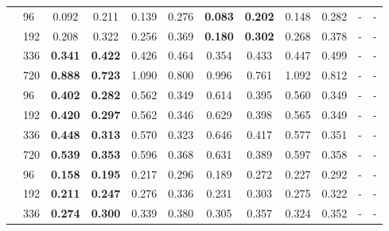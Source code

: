 \begin{table}[ht!]
\begin{center}
\begin{tabular}{ll | cccccccccc}
\parbox[t]{0.2mm}{}
	& 96  & 0.092           & 0.211           & 0.139          & 0.276          & \textbf{0.083}  & \textbf{0.202}  & 0.148      & 0.282            & -           & -     \\
	& 192 & 0.208           & 0.322           & 0.256          & 0.369          & \textbf{0.180}  & \textbf{0.302}  & 0.268      & 0.378            & -           & -     \\
	& 336 & \textbf{0.341}  & \textbf{0.422}  & 0.426          & 0.464          & 0.354           & 0.433           & 0.447      & 0.499            & -           & -     \\
	& 720 & \textbf{0.888}  & \textbf{0.723}  & 1.090          & 0.800          & 0.996           & 0.761           & 1.092      & 0.812            & -           & -     \\ \midrule
\parbox[t]{0.2mm}{}        
	& 96  & \textbf{0.402}  & \textbf{0.282}  & 0.562          & 0.349          & 0.614           & 0.395           & 0.560      & 0.349            & -           & -     \\
	& 192 & \textbf{0.420}  & \textbf{0.297}  & 0.562          & 0.346          & 0.629           & 0.398           & 0.565      & 0.349            & -           & -     \\
	& 336 & \textbf{0.448}  & \textbf{0.313}  & 0.570          & 0.323          & 0.646           & 0.417           & 0.577      & 0.351            & -           & -     \\
	& 720 & \textbf{0.539}  & \textbf{0.353}  & 0.596          & 0.368          & 0.631           & 0.389           & 0.597      & 0.358            & -           & -     \\ \midrule
\parbox[t]{0.2mm}{}        
	& 96  & \textbf{0.158}  & \textbf{0.195}  & 0.217          & 0.296          & 0.189           & 0.272           & 0.227      & 0.292            & -           & -     \\
	& 192 & \textbf{0.211}  & \textbf{0.247}  & 0.276          & 0.336          & 0.231           & 0.303           & 0.275      & 0.322            & -           & -     \\
	& 336 & \textbf{0.274}  & \textbf{0.300}  & 0.339          & 0.380          & 0.305           & 0.357           & 0.324      & 0.352            & -           & -     \\

\end{tabular}
\end{center}
\end{table}

